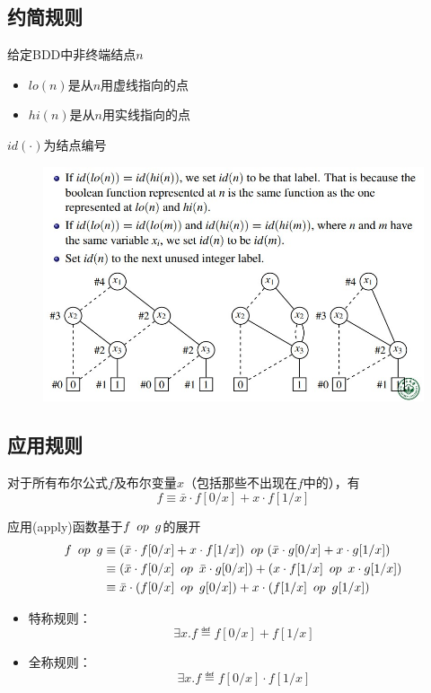 \subsection{约简规则}
\begin{definition}
给定BDD中非终端结点$n$
\begin{itemize}
	\item $lo(n)$是从$n$用虚线指向的点
	\item $hi(n)$是从$n$用实线指向的点
\end{itemize}
$id(\cdot)$为结点编号
\end{definition}

\begin{figure}[H]
\centering
\includegraphics[width=0.8\linewidth]{fig/reduce_alg.jpg}
\end{figure}

\subsection{应用规则}
\begin{definition}
对于所有布尔公式$f$及布尔变量$x$（包括那些不出现在$f$中的），有
\[f\equiv\bar{x}\cdot f[0/x]+x\cdot f[1/x]\]
\end{definition}
应用(apply)函数基于$f \ \mathop{op}\  g$的展开
\[\begin{aligned}
f \ \mathop{op}\  g &\equiv(\bar{x}\cdot f[0/x]+x\cdot f[1/x])\ \mathop{op}\ (\bar{x}\cdot g[0/x]+x\cdot g[1/x])\\
&\equiv(\bar{x}\cdot f[0/x]\ \mathop{op}\ \bar{x}\cdot g[0/x])+(x\cdot f[1/x]\ \mathop{op}\  x\cdot g[1/x])\\
&\equiv\bar{x}\cdot(f[0/x]\ \mathop{op}\  g[0/x])+x\cdot(f[1/x]\ \mathop{op}\  g[1/x])
\end{aligned}\]

\begin{itemize}
\item 特称规则：
\[\exists x.f\eqdef f[0/x]+f[1/x]\]
\item 全称规则：
\[\exists x.f\eqdef f[0/x]\cdot f[1/x]\]
\end{itemize}

